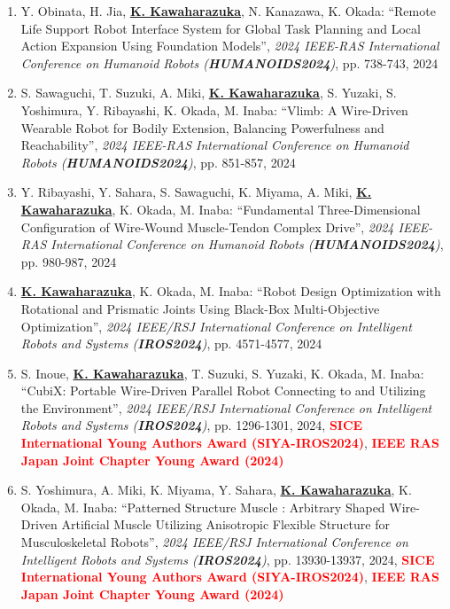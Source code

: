 \documentclass[letterpaper,11pt]{article}
\begin{document}
\begin{enumerate}
\item Y. Obinata, H. Jia, \underline{\textbf{K. Kawaharazuka}}, N. Kanazawa, K. Okada: ``Remote Life Support Robot Interface System for Global Task Planning and Local Action Expansion Using Foundation Models'', \textit{2024 IEEE-RAS International Conference on Humanoid Robots (\textit{\textbf{HUMANOIDS2024}})}, pp. 738-743, 2024
\item S. Sawaguchi, T. Suzuki, A. Miki, \underline{\textbf{K. Kawaharazuka}}, S. Yuzaki, S. Yoshimura, Y. Ribayashi, K. Okada, M. Inaba: ``Vlimb: A Wire-Driven Wearable Robot for Bodily Extension, Balancing Powerfulness and Reachability'', \textit{2024 IEEE-RAS International Conference on Humanoid Robots (\textit{\textbf{HUMANOIDS2024}})}, pp. 851-857, 2024
\item Y. Ribayashi, Y. Sahara, S. Sawaguchi, K. Miyama, A. Miki, \underline{\textbf{K. Kawaharazuka}}, K. Okada, M. Inaba: ``Fundamental Three-Dimensional Configuration of Wire-Wound Muscle-Tendon Complex Drive'', \textit{2024 IEEE-RAS International Conference on Humanoid Robots (\textit{\textbf{HUMANOIDS2024}})}, pp. 980-987, 2024
\item \underline{\textbf{K. Kawaharazuka}}, K. Okada, M. Inaba: ``Robot Design Optimization with Rotational and Prismatic Joints Using Black-Box Multi-Objective Optimization'', \textit{2024 IEEE/RSJ International Conference on Intelligent Robots and Systems (\textit{\textbf{IROS2024}})}, pp. 4571-4577, 2024
\item S. Inoue, \underline{\textbf{K. Kawaharazuka}}, T. Suzuki, S. Yuzaki, K. Okada, M. Inaba: ``CubiX: Portable Wire-Driven Parallel Robot Connecting to and Utilizing the Environment'', \textit{2024 IEEE/RSJ International Conference on Intelligent Robots and Systems (\textit{\textbf{IROS2024}})}, pp. 1296-1301, 2024, \textbf{\textcolor{red}{SICE International Young Authors Award (SIYA-IROS2024)}}, \textbf{\textcolor{red}{IEEE RAS Japan Joint Chapter Young Award (2024)}}
\item S. Yoshimura, A. Miki, K. Miyama, Y. Sahara, \underline{\textbf{K. Kawaharazuka}}, K. Okada, M. Inaba: ``Patterned Structure Muscle : Arbitrary Shaped Wire-Driven Artificial Muscle Utilizing Anisotropic Flexible Structure for Musculoskeletal Robots'', \textit{2024 IEEE/RSJ International Conference on Intelligent Robots and Systems (\textit{\textbf{IROS2024}})}, pp. 13930-13937, 2024, \textbf{\textcolor{red}{SICE International Young Authors Award (SIYA-IROS2024)}}, \textbf{\textcolor{red}{IEEE RAS Japan Joint Chapter Young Award (2024)}}

\end{enumerate}
\end{document}
